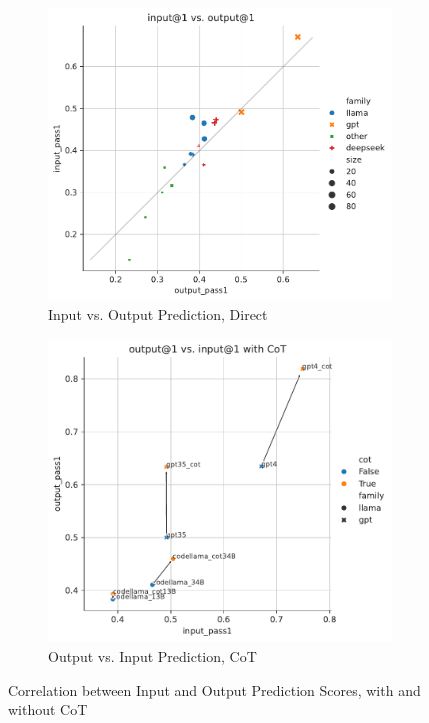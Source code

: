 \documentclass{article}
\begin{document}
\begin{figure}[H]
     \centering
     \begin{subfigure}[b]{0.49\textwidth}
         \centering
         \includegraphics[scale=0.49]{figs/scatter/output_1_vs_input_1.pdf}
         \caption{Input vs. Output Prediction, Direct}
         \label{fig:quant-analysis-input-output-direct}
     \end{subfigure}
     \hfill
     \begin{subfigure}[b]{0.49\textwidth}
         \centering
         \includegraphics[scale=0.5]{figs/scatter/cot_input_pass1_output_pass1.pdf}
         \caption{Output vs. Input Prediction, CoT}
         \label{fig:quant-analysis-input-output-cot}
     \end{subfigure}
     \caption{Correlation between Input and Output Prediction Scores, with and without CoT}
     \label{fig:quant-analysis-input-output}
\end{figure}
\end{document}
